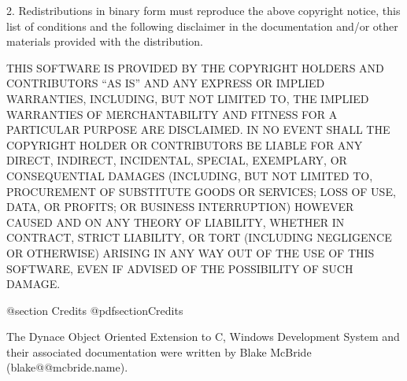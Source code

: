 2. Redistributions in binary form must reproduce the above copyright
notice, this list of conditions and the following disclaimer in the
documentation and/or other materials provided with the distribution.

THIS SOFTWARE IS PROVIDED BY THE COPYRIGHT HOLDERS AND CONTRIBUTORS
``AS IS'' AND ANY EXPRESS OR IMPLIED WARRANTIES, INCLUDING, BUT NOT
LIMITED TO, THE IMPLIED WARRANTIES OF MERCHANTABILITY AND FITNESS FOR
A PARTICULAR PURPOSE ARE DISCLAIMED. IN NO EVENT SHALL THE COPYRIGHT
HOLDER OR CONTRIBUTORS BE LIABLE FOR ANY DIRECT, INDIRECT, INCIDENTAL,
SPECIAL, EXEMPLARY, OR CONSEQUENTIAL DAMAGES (INCLUDING, BUT NOT
LIMITED TO, PROCUREMENT OF SUBSTITUTE GOODS OR SERVICES; LOSS OF USE,
DATA, OR PROFITS; OR BUSINESS INTERRUPTION) HOWEVER CAUSED AND ON ANY
THEORY OF LIABILITY, WHETHER IN CONTRACT, STRICT LIABILITY, OR TORT
(INCLUDING NEGLIGENCE OR OTHERWISE) ARISING IN ANY WAY OUT OF THE USE
OF THIS SOFTWARE, EVEN IF ADVISED OF THE POSSIBILITY OF SUCH DAMAGE.


@section Credits
@pdfsection{Credits}

The Dynace Object Oriented Extension to C, Windows Development System
and their associated documentation were written by Blake McBride
(blake@@mcbride.name).


